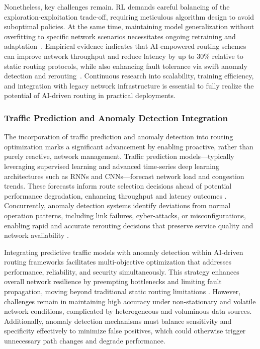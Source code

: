 \documentclass[sigconf]{acmart}
\begin{document}
Nonetheless, key challenges remain. RL demands careful balancing of the exploration-exploitation trade-off, requiring meticulous algorithm design to avoid suboptimal policies. At the same time, maintaining model generalization without overfitting to specific network scenarios necessitates ongoing retraining and adaptation~\cite{ref53}. Empirical evidence indicates that AI-empowered routing schemes can improve network throughput and reduce latency by up to 30\% relative to static routing protocols, while also enhancing fault tolerance via swift anomaly detection and rerouting~\cite{ref4}. Continuous research into scalability, training efficiency, and integration with legacy network infrastructure is essential to fully realize the potential of AI-driven routing in practical deployments.

\subsubsection{Traffic Prediction and Anomaly Detection Integration}

The incorporation of traffic prediction and anomaly detection into routing optimization marks a significant advancement by enabling proactive, rather than purely reactive, network management. Traffic prediction models—typically leveraging supervised learning and advanced time-series deep learning architectures such as RNNs and CNNs—forecast network load and congestion trends. These forecasts inform route selection decisions ahead of potential performance degradation, enhancing throughput and latency outcomes \cite{ref50}. Concurrently, anomaly detection systems identify deviations from normal operation patterns, including link failures, cyber-attacks, or misconfigurations, enabling rapid and accurate rerouting decisions that preserve service quality and network availability \cite{ref53}.

Integrating predictive traffic models with anomaly detection within AI-driven routing frameworks facilitates multi-objective optimization that addresses performance, reliability, and security simultaneously. This strategy enhances overall network resilience by preempting bottlenecks and limiting fault propagation, moving beyond traditional static routing limitations \cite{ref53}. However, challenges remain in maintaining high accuracy under non-stationary and volatile network conditions, complicated by heterogeneous and voluminous data sources. Additionally, anomaly detection mechanisms must balance sensitivity and specificity effectively to minimize false positives, which could otherwise trigger unnecessary path changes and degrade performance. 
\end{document}
